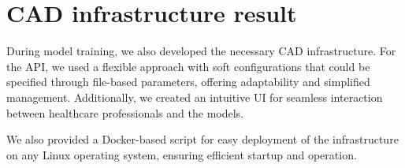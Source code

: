\section{CAD infrastructure result}


During model training, we also developed the necessary CAD infrastructure. For
the API, we used a flexible approach with soft configurations that could be
specified through file-based parameters, offering adaptability and simplified
management. Additionally, we created an intuitive UI for seamless interaction
between healthcare professionals and the models.

We also provided a Docker-based script for easy deployment of the
infrastructure on any Linux operating system, ensuring efficient startup and
operation.
